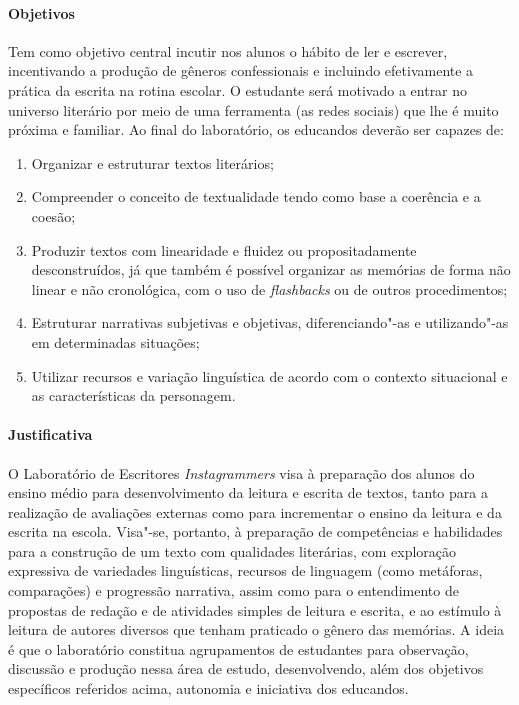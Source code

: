 \documentclass{article}
\begin{document}
\paragraph{Objetivos}

Tem como objetivo central incutir nos alunos o hábito de ler e escrever,
incentivando a produção de gêneros confessionais e incluindo
efetivamente a prática da escrita na rotina escolar. O estudante será
motivado a entrar no universo literário por meio de uma ferramenta (as
redes sociais) que lhe é muito próxima e familiar. Ao final do
laboratório, os educandos deverão ser capazes de:

\begin{enumerate}
\item
Organizar e estruturar textos literários;

\item
Compreender o conceito de textualidade tendo como base a coerência e a
coesão;

\item
Produzir textos com linearidade e fluidez ou propositadamente
desconstruídos, já que também é possível organizar as memórias de forma
não linear e não cronológica, com o uso de \emph{flashbacks} ou de
outros procedimentos;

\item
Estruturar narrativas subjetivas e objetivas, diferenciando"-as e
utilizando"-as em determinadas situações;

\item
Utilizar recursos e variação linguística de acordo com o contexto
situacional e as características da personagem.
\end{enumerate}

\paragraph{Justificativa}
O Laboratório de Escritores \emph{Instagrammers} visa à preparação dos
alunos do ensino médio para desenvolvimento da leitura e escrita de
textos, tanto para a realização de avaliações externas como para
incrementar o ensino da leitura e da escrita na escola. Visa"-se,
portanto, à preparação de competências e habilidades para a construção
de um texto com qualidades literárias, com exploração expressiva de
variedades linguísticas, recursos de linguagem (como metáforas,
comparações) e progressão narrativa, assim como para o entendimento de
propostas de redação e de atividades simples de leitura e escrita, e ao
estímulo à leitura de autores diversos que tenham praticado o gênero das
memórias. A ideia é que o laboratório constitua agrupamentos de
estudantes para observação, discussão e produção nessa área de estudo,
desenvolvendo, além dos objetivos específicos referidos acima, autonomia
e iniciativa dos educandos.
\end{document}

